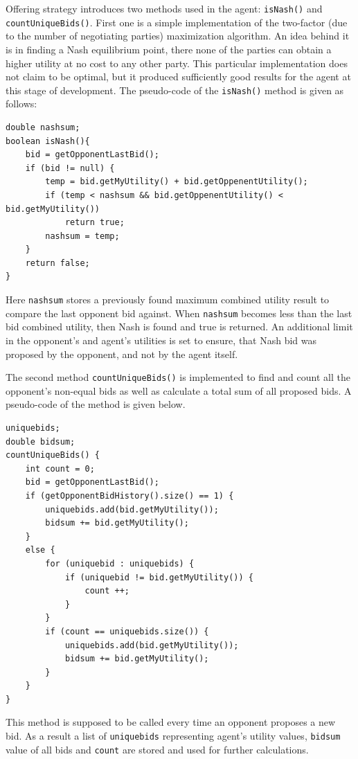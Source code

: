 \documentclass[html]{report}    %
\begin{document}
Offering strategy introduces two methods used in the agent: \texttt{isNash()} and \texttt{countUniqueBids()}. First one is a simple implementation of the two-factor (due to the number of negotiating parties) maximization algorithm. An idea behind it is in finding a Nash equilibrium point, there none of the parties can obtain a higher utility at no cost to any other party. This particular implementation does not claim to be optimal, but it produced sufficiently good results for the agent at this stage of development. The pseudo-code of the  \texttt{isNash()} method is given as follows:
\begin{verbatim}
double nashsum;
boolean isNash(){
    bid = getOpponentLastBid();		
    if (bid != null) {
        temp = bid.getMyUtility() + bid.getOppenentUtility();
        if (temp < nashsum && bid.getOppenentUtility() < bid.getMyUtility())
            return true;			
        nashsum = temp;
    }		
    return false;
}
\end{verbatim}
Here \texttt{nashsum} stores a previously found maximum combined utility result to compare the last opponent bid against. When \texttt{nashsum} becomes less than the last bid combined utility, then Nash is found and true is returned. An additional limit in the opponent's and agent's utilities is set to ensure, that Nash bid was proposed by the opponent, and not by the agent itself.

The second method \texttt{countUniqueBids()} is implemented to find and count all the opponent's non-equal bids as well as calculate a total sum of all proposed bids. A pseudo-code of the method is given below.
\begin{verbatim}
uniquebids;
double bidsum;
countUniqueBids() {
    int count = 0;
    bid = getOpponentLastBid();	
    if (getOpponentBidHistory().size() == 1) {
        uniquebids.add(bid.getMyUtility());
        bidsum += bid.getMyUtility();
    }
    else {
        for (uniquebid : uniquebids) {
            if (uniquebid != bid.getMyUtility()) {
                count ++;
            }
        }
        if (count == uniquebids.size()) {
            uniquebids.add(bid.getMyUtility());
            bidsum += bid.getMyUtility();
        }
    }
}  
\end{verbatim}
This method is supposed to be called every time an opponent proposes a new bid. As a result a list of \texttt{uniquebids} representing agent's utility values, \texttt{bidsum} value of all bids and \texttt{count} are stored and used for further calculations.
\end{document}
